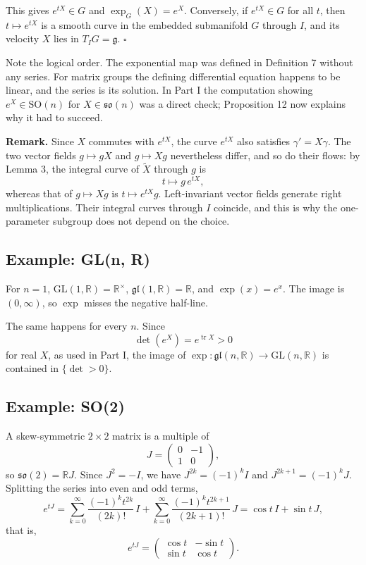 \documentclass[11pt]{article}
\begin{document}
This gives $e^{tX} \in G$ and $\exp_G(X) = e^X$. Conversely, if $e^{tX} \in G$ for all $t$, then $t \mapsto e^{tX}$ is a smooth curve in the embedded submanifold $G$ through $I$, and its velocity $X$ lies in $T_IG = \mathfrak{g}$. $\square$

Note the logical order. The exponential map was defined in Definition 7 without any series. For matrix groups the defining differential equation happens to be linear, and the series is its solution. In Part I the computation showing $e^X \in \mathrm{SO}(n)$ for $X \in \mathfrak{so}(n)$ was a direct check; Proposition 12 now explains why it had to succeed.

\textbf{Remark.} Since $X$ commutes with $e^{tX}$, the curve $e^{tX}$ also satisfies $\gamma' = X\gamma$. The two vector fields $g \mapsto gX$ and $g \mapsto Xg$ nevertheless differ, and so do their flows: by Lemma 3, the integral curve of $\widetilde{X}$ through $g$ is
\[
t \longmapsto g\, e^{tX},
\]
whereas that of $g \mapsto Xg$ is $t \mapsto e^{tX} g$. Left-invariant vector fields generate right multiplications. Their integral curves through $I$ coincide, and this is why the one-parameter subgroup does not depend on the choice.

\subsection{Example: GL(n, R)}

For $n = 1$, $\mathrm{GL}(1, \mathbb{R}) = \mathbb{R}^\times$, $\mathfrak{gl}(1, \mathbb{R}) = \mathbb{R}$, and $\exp(x) = e^x$. The image is $(0, \infty)$, so $\exp$ misses the negative half-line.

The same happens for every $n$. Since
\[
\det(e^X) = e^{\operatorname{tr} X} > 0
\]
for real $X$, as used in Part I, the image of $\exp : \mathfrak{gl}(n, \mathbb{R}) \to \mathrm{GL}(n, \mathbb{R})$ is contained in $\{ \det > 0 \}$.

\subsection{Example: SO(2)}

A skew-symmetric $2 \times 2$ matrix is a multiple of
\[
J = \begin{pmatrix} 0 & -1 \\ 1 & 0 \end{pmatrix},
\]
so $\mathfrak{so}(2) = \mathbb{R}J$. Since $J^2 = -I$, we have $J^{2k} = (-1)^k I$ and $J^{2k+1} = (-1)^k J$. Splitting the series into even and odd terms,
\[
e^{tJ} = \sum_{k=0}^{\infty} \frac{(-1)^k t^{2k}}{(2k)!}\, I + \sum_{k=0}^{\infty} \frac{(-1)^k t^{2k+1}}{(2k+1)!}\, J = \cos t\, I + \sin t\, J,
\]
that is,
\[
\boxed{
e^{tJ} = \begin{pmatrix} \cos t & -\sin t \\ \sin t & \cos t \end{pmatrix}.
}
\]
\end{document}
